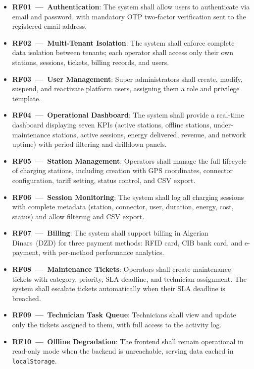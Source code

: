 \documentclass[12pt,a4paper]{report}
\begin{document}
\begin{itemize}
  \item \textbf{RF01~---~Authentication}: The system shall allow users to authenticate via
        email and password, with mandatory OTP two-factor verification sent to the registered
        email address.
  \item \textbf{RF02~---~Multi-Tenant Isolation}: The system shall enforce complete data
        isolation between tenants; each operator shall access only their own stations, sessions,
        tickets, billing records, and users.
  \item \textbf{RF03~---~User Management}: Super administrators shall create, modify, suspend,
        and reactivate platform users, assigning them a role and privilege template.
  \item \textbf{RF04~---~Operational Dashboard}: The system shall provide a real-time dashboard
        displaying seven KPIs (active stations, offline stations, under-maintenance stations,
        active sessions, energy delivered, revenue, and network uptime) with period filtering
        and drilldown panels.
  \item \textbf{RF05~---~Station Management}: Operators shall manage the full lifecycle of
        charging stations, including creation with GPS coordinates, connector configuration,
        tariff setting, status control, and CSV export.
  \item \textbf{RF06~---~Session Monitoring}: The system shall log all charging sessions with
        complete metadata (station, connector, user, duration, energy, cost, status) and allow
        filtering and CSV export.
  \item \textbf{RF07~---~Billing}: The system shall support billing in Algerian Dinars~(DZD)
        for three payment methods: RFID card, CIB bank card, and e-payment, with per-method
        performance analytics.
  \item \textbf{RF08~---~Maintenance Tickets}: Operators shall create maintenance tickets with
        category, priority, SLA deadline, and technician assignment. The system shall escalate
        tickets automatically when their SLA deadline is breached.
  \item \textbf{RF09~---~Technician Task Queue}: Technicians shall view and update only the
        tickets assigned to them, with full access to the activity log.
  \item \textbf{RF10~---~Offline Degradation}: The frontend shall remain operational in
        read-only mode when the backend is unreachable, serving data cached in
        \texttt{localStorage}.
\end{itemize}
\end{document}
